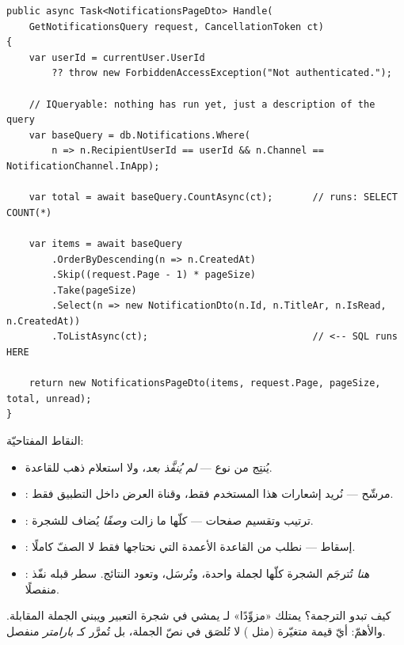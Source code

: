 \begin{english}
\begin{lstlisting}[language={[Sharp]C}]
public async Task<NotificationsPageDto> Handle(
    GetNotificationsQuery request, CancellationToken ct)
{
    var userId = currentUser.UserId
        ?? throw new ForbiddenAccessException("Not authenticated.");

    // IQueryable: nothing has run yet, just a description of the query
    var baseQuery = db.Notifications.Where(
        n => n.RecipientUserId == userId && n.Channel == NotificationChannel.InApp);

    var total = await baseQuery.CountAsync(ct);       // runs: SELECT COUNT(*)

    var items = await baseQuery
        .OrderByDescending(n => n.CreatedAt)
        .Skip((request.Page - 1) * pageSize)
        .Take(pageSize)
        .Select(n => new NotificationDto(n.Id, n.TitleAr, n.IsRead, n.CreatedAt))
        .ToListAsync(ct);                             // <-- SQL runs HERE

    return new NotificationsPageDto(items, request.Page, pageSize, total, unread);
}
\end{lstlisting}
\end{english}

النقاط المفتاحيّة:
\begin{itemize}
\item {} يُنتِج  من نوع
   — \emph{لم يُنفَّذ بعد}، ولا استعلام ذهب للقاعدة.
\item {}: مرشّح — نُريد إشعارات هذا
  المستخدم فقط، وقناة العرض داخل التطبيق فقط.
\item {}: ترتيب وتقسيم صفحات — كلّها
  ما زالت \emph{وصفًا} يُضاف للشجرة.
\item {}: إسقاط  —
  نطلب من القاعدة الأعمدة التي نحتاجها فقط لا الصفّ كاملًا.
\item {}: \emph{هنا} تُترجَم الشجرة كلّها لجملة 
  واحدة، وتُرسَل، وتعود النتائج. سطر  قبله نفّذ 
  منفصلًا.
\end{itemize}

كيف تبدو الترجمة؟  يمتلك «مزوِّدًا»  لـ 
يمشي في شجرة التعبير ويبني الجملة المقابلة. والأهمّ: أيّ قيمة متغيّرة (مثل
) لا تُلصَق في نصّ الجملة، بل تُمرَّر كـ \emph{بارامتر} منفصل.

